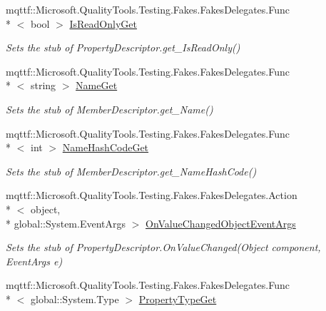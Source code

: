 \begin{DoxyCompactItemize}
mqttf\-::\-Microsoft.\-Quality\-Tools.\-Testing.\-Fakes.\-Fakes\-Delegates.\-Func\\*
$<$ bool $>$ \hyperlink{class_system_1_1_component_model_1_1_fakes_1_1_stub_property_descriptor_a5a5d295228dfc199d4b78fac6ad7d5e4}{Is\-Read\-Only\-Get}
\begin{DoxyCompactList}\small\item\em Sets the stub of Property\-Descriptor.\-get\-\_\-\-Is\-Read\-Only()\end{DoxyCompactList}\item 
mqttf\-::\-Microsoft.\-Quality\-Tools.\-Testing.\-Fakes.\-Fakes\-Delegates.\-Func\\*
$<$ string $>$ \hyperlink{class_system_1_1_component_model_1_1_fakes_1_1_stub_property_descriptor_a5d655b0472946c983fef56831bf11025}{Name\-Get}
\begin{DoxyCompactList}\small\item\em Sets the stub of Member\-Descriptor.\-get\-\_\-\-Name()\end{DoxyCompactList}\item 
mqttf\-::\-Microsoft.\-Quality\-Tools.\-Testing.\-Fakes.\-Fakes\-Delegates.\-Func\\*
$<$ int $>$ \hyperlink{class_system_1_1_component_model_1_1_fakes_1_1_stub_property_descriptor_a4f3ae763ab9da7df301f635151976bb6}{Name\-Hash\-Code\-Get}
\begin{DoxyCompactList}\small\item\em Sets the stub of Member\-Descriptor.\-get\-\_\-\-Name\-Hash\-Code()\end{DoxyCompactList}\item 
mqttf\-::\-Microsoft.\-Quality\-Tools.\-Testing.\-Fakes.\-Fakes\-Delegates.\-Action\\*
$<$ object, \\*
global\-::\-System.\-Event\-Args $>$ \hyperlink{class_system_1_1_component_model_1_1_fakes_1_1_stub_property_descriptor_aacd5c5810a5fa57460d3c0bd18b97e8e}{On\-Value\-Changed\-Object\-Event\-Args}
\begin{DoxyCompactList}\small\item\em Sets the stub of Property\-Descriptor.\-On\-Value\-Changed(\-Object component, Event\-Args e)\end{DoxyCompactList}\item 
mqttf\-::\-Microsoft.\-Quality\-Tools.\-Testing.\-Fakes.\-Fakes\-Delegates.\-Func\\*
$<$ global\-::\-System.\-Type $>$ \hyperlink{class_system_1_1_component_model_1_1_fakes_1_1_stub_property_descriptor_a374d78e2df16a021b79125c92032aa89}{Property\-Type\-Get}

\end{DoxyCompactItemize}
